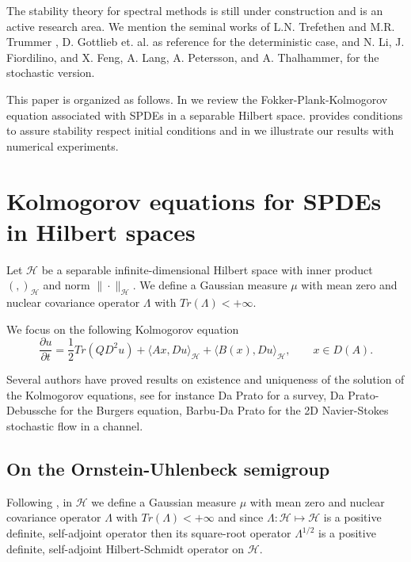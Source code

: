\documentclass[]{interact}
\theoremstyle{plain}%
\theoremstyle{definition}
\theoremstyle{remark}
\begin{document}
        The stability theory for spectral methods is still under 
    construction and is an active research area. We mention the seminal works of
    L.N. Trefethen and M.R. Trummer \cite{Trefethen1987}, D. Gottlieb et. al.
    \cite{Gottlieb1987a} as reference for the deterministic case, and N. Li, J.
    Fiordilino, and X. Feng, \cite{Li2019} A. Lang, A. Petersson,  and A.
    Thalhammer, \cite{Lang2017} for the stochastic version.
    
   
    
    
    
        This paper is organized as follows. In  we review the
    Fokker-Plank-Kolmogorov equation associated with SPDEs in
    a separable Hilbert space.  
    provides conditions to assure stability respect initial conditions and in 
     we illustrate our
    results with numerical experiments.

\section{Kolmogorov equations for SPDEs in Hilbert spaces}
\label{fpk-sect}
        Let $\mathcal{H}$ be a separable infinite-dimensional Hilbert space with
    inner product $( ,  )_\mathcal{H} $ and norm $\|\cdot\|_\mathcal{H}$. We 
    define a Gaussian measure $\mu$ with mean zero and nuclear covariance 
    operator $\Lambda$ with  $Tr(\Lambda)<+\infty$.

    We focus on the following Kolmogorov equation
    \begin{equation}
        \label{P1s2.3}
        \frac{\partial u}{\partial t}
            = \frac{1}{2} Tr(QD^2u)
            + \langle Ax, Du
                \rangle_\mathcal{H} 
            + \langle B(x),Du \rangle_\mathcal{H},
            \qquad x\in D(A).
    \end{equation}

        Several authors have proved results on existence and uniqueness of the
    solution of the Kolmogorov equations, see for instance Da Prato \cite{da} 
    for a survey, Da Prato-Debussche \cite{da-de} for the Burgers equation,  
    Barbu-Da Prato \cite{ba-da} for the 2D Navier-Stokes stochastic flow in a 
    channel.
%
    \subsection{On the Ornstein-Uhlenbeck semigroup}
        \label{OUS-sect}
        Following \cite{liu},  in $\mathcal{H}$ we define a Gaussian measure 
        $\mu$ with mean zero and nuclear covariance operator $\Lambda$ with
        ${Tr(\Lambda)<+\infty}$ and since 
        $
            \Lambda:\mathcal{H}\mapsto \mathcal{H}
        $ 
    is a positive definite, self-adjoint operator then its square-root operator
    $\Lambda^{1/2}$ is a positive definite, self-adjoint Hilbert-Schmidt 
    operator on $\mathcal{H}$.
\end{document}

